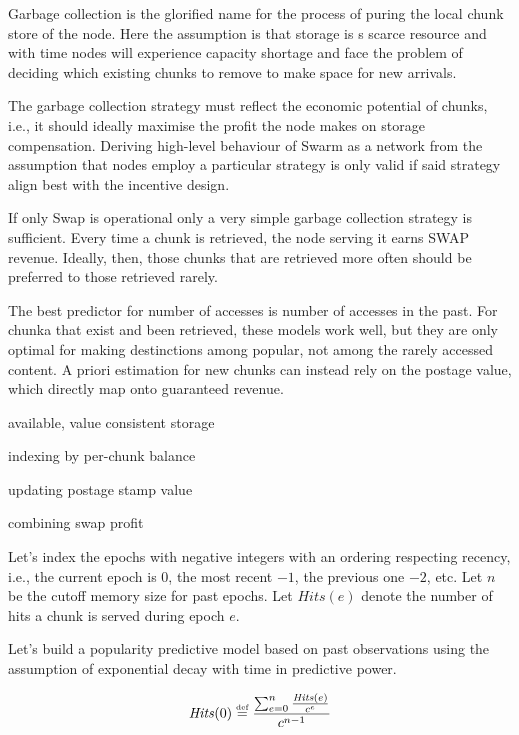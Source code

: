 Garbage collection is the glorified name for the process of puring the local chunk store of the node. 
Here the assumption is that storage is s scarce resource and with time nodes will experience capacity shortage and face the problem  of deciding which   existing chunks to remove to make space for new arrivals. 

The garbage collection strategy must reflect the economic potential of chunks, i.e., it should ideally maximise the profit the node makes on storage compensation. Deriving high-level behaviour of Swarm as a network from the assumption that nodes employ a particular strategy is only valid if said strategy align best with the incentive design.

If only Swap is operational only a very simple garbage collection strategy is sufficient. Every time a chunk is retrieved, the node serving it earns SWAP revenue. Ideally, then, those chunks that are retrieved more often should be preferred to those retrieved rarely.

The best predictor for number of accesses is number of accesses in the past. For chunka that exist and been retrieved, these models work well, but they are only optimal for making destinctions among popular, not among the rarely accessed content. A priori estimation for new chunks can instead rely on the postage value, which directly  map onto guaranteed revenue.  


available, value consistent storage

indexing by per-chunk balance

updating postage stamp value 

combining swap profit 

Let's  index  the epochs with negative integers with an ordering respecting recency, i.e., the current epoch is 0, the most recent $-1$, the previous one $-2$, etc. 
Let $n$ be the cutoff memory size for past epochs.
Let $\mathit{Hits}(e)$ denote the number of hits a chunk is served during epoch $e$. 

Let's build a popularity predictive model based on past observations using the assumption of exponential decay with time in predictive power. 

\begin{equation}
    \mathit{Hits}(0) \overset{\textrm{\tiny def}}{=} \frac{\sum_{e=0}^n \frac{\mathit{Hits}(e)}{c^e}}{c^{n-1}}
\end{equation}